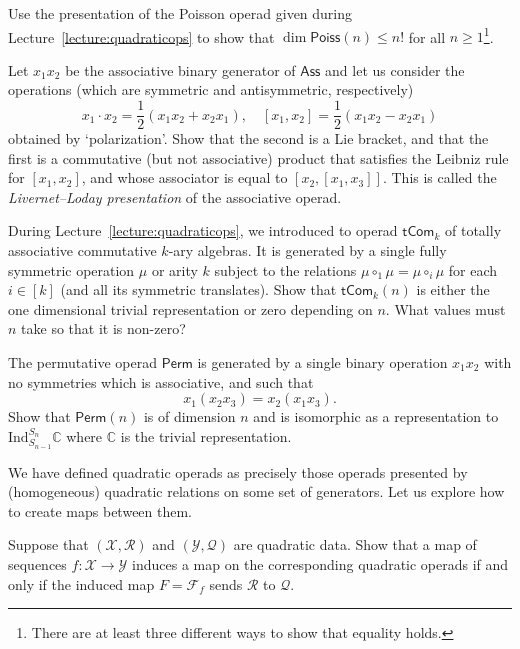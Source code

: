 \begin{question} Use the presentation of the Poisson operad given
during Lecture~\ref{lecture:quadraticops} to show that $\dim\mathsf{Poiss}(n)\leqslant n!$
for all $n\geqslant 1$\footnote{There are at least three different
ways to show that equality holds.}. 
\end{question}

\begin{question} Let $x_1x_2$ be the associative binary generator of
$\mathsf{Ass}$ and let us consider the operations (which are symmetric
and antisymmetric, respectively)
\[x_1\cdot x_2 = \frac{1}{2}(x_1x_2+x_2x_1), \quad 
	 [x_1,x_2] = \frac{1}{2}(x_1x_2-x_2x_1) 	
	 \]
obtained by `polarization'. Show that the second is a Lie bracket,
and that the first is a commutative (but not associative) product
that satisfies the Leibniz rule for $[x_1,x_2]$, and whose associator
is equal to $[x_2,[x_1,x_3]]$. This is called the \emph{Livernet--Loday
presentation} of the associative operad.
\end{question}

\begin{question} 
During Lecture~\ref{lecture:quadraticops}, we introduced to operad $\mathsf{tCom}_k$ of totally
associative commutative $k$-ary algebras. It is generated by a single
fully symmetric operation $\mu$ or arity $k$ subject to the relations
$\mu\circ_1\mu = \mu\circ_i\mu$
for each $i\in [k]$ (and all its symmetric translates).
Show that $\mathsf{tCom}_k(n)$ is either the one dimensional trivial
representation or zero depending on $n$. What values must
$n$ take so that it is non-zero? 
\end{question}

\begin{question}
The permutative operad $\mathsf{Perm}$ is generated by a single
binary operation $x_1x_2$ with no symmetries which is associative,
and such that
\[ x_1(x_2x_3) = x_2(x_1x_3). \]
Show that $\mathsf{Perm}(n)$ is of dimension $n$ and is
isomorphic as a representation to $\mathrm{Ind}_{S_{n-1}}^{S_n}\mathbb{C}$
where $\mathbb{C}$ is the trivial representation.
\end{question}



We have defined quadratic operads as precisely those
operads presented by (homogeneous) quadratic relations
on some set of generators. Let us explore how to create
maps between them.



\begin{question}
Suppose that $(\mathcal{X},\mathcal{R})$ and $(\mathcal{Y},\mathcal Q)$
are quadratic data. Show that a
map of sequences $f: \mathcal{X} \longrightarrow \mathcal{Y}$
induces a map on the corresponding quadratic operads if and only if
the induced map $F = \mathcal{F}_f$ sends $\mathcal{R}$ to
$\mathcal{Q}$.
\end{question}

